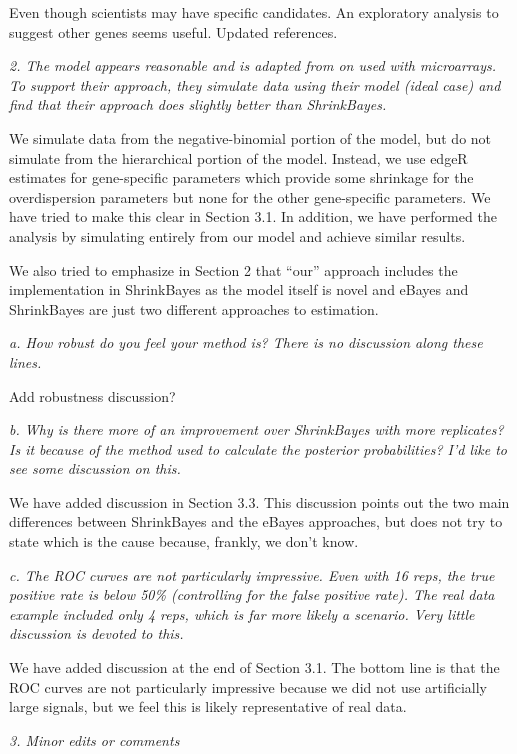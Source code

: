 \documentclass{article}
\newcommand{\comment}[1]{\textit{#1}}
\newcommand{\response}[1]{#1}
\newcommand{\todo}[1]{{\color{red} #1}}
\begin{document}
\response{Even though scientists may have specific candidates. An exploratory analysis to suggest other genes seems useful.} \todo{Updated references.}

\comment{2. The model appears reasonable and is adapted from on used with microarrays.  To support their approach, they simulate data using their model (ideal case) and find that their approach does slightly better than ShrinkBayes.}

\response{We simulate data from the negative-binomial portion of the model, but do not simulate from the hierarchical portion of the model. Instead, we use edgeR estimates for gene-specific parameters which provide some shrinkage for the overdispersion parameters but none for the other gene-specific parameters. We have tried to make this clear in Section 3.1. In addition, we have performed the analysis by simulating entirely from our model and achieve similar results.}

\response{We also tried to emphasize in Section 2 that ``our'' approach includes the implementation in ShrinkBayes as the model itself is novel and eBayes and ShrinkBayes are just two different approaches to estimation.}

\comment{a. How robust do you feel your method is?  There is no discussion along these lines.}

\todo{Add robustness discussion?}

\comment{b.      Why is there more of an improvement over ShrinkBayes with more replicates?  Is it because of the method used to calculate the posterior probabilities?  I'd like to see some discussion on this.}

\response{We have added discussion in Section 3.3. This discussion points out the two main differences between ShrinkBayes and the eBayes approaches, but does not try to state which is the cause because, frankly, we don't know.}

\comment{c.      The ROC curves are not particularly impressive.  Even with 16 reps, the true positive rate is below 50\% (controlling for the false positive rate).  The real data example included only 4 reps, which is far more likely a scenario.  Very little discussion is devoted to this.}

\response{We have added discussion at the end of Section 3.1. The bottom line is that the ROC curves are not particularly impressive because we did not use artificially large signals, but we feel this is likely representative of real data.}

\comment{3.      Minor edits or comments}
\end{document}
